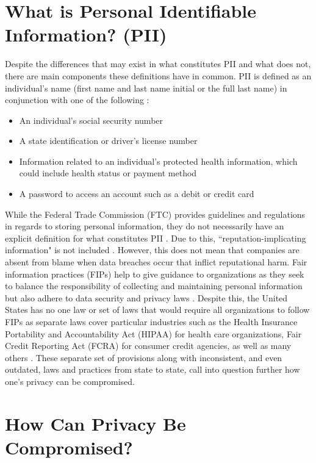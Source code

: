 \documentclass[sigconf]{acmart}
\begin{document}
\section{What is Personal Identifiable Information? (PII)}

Despite the differences that may exist in what constitutes PII and what does not, there are main components these definitions have in common. PII is defined as an individual's name (first name and last name initial or the full last name) in conjunction with one of the following \cite{Agelidis2016}:

\begin{itemize}
  \item An individual's social security number 
  \item A state identification or driver's license number
  \item Information related to an individual's protected health information, which could include health status or payment method
  \item A password to access an account such as a debit or credit card
\end{itemize} 

While the Federal Trade Commission (FTC) provides guidelines and regulations in regards to storing personal information, they do not necessarily have an explicit definition for what constitutes PII \cite{Agelidis2016}. Due to this, ``reputation-implicating information" is not included \cite{Agelidis2016}. However, this does not mean that companies are absent from blame when data breaches occur that inflict reputational harm. Fair information practices (FIPs) help to give guidance to organizations as they seek to balance the responsibility of collecting and maintaining personal information but also adhere to data security and privacy laws \cite{Culnan2009}. Despite this, the United States has no one law or set of laws that would require all organizations to follow FIPs as separate laws cover particular industries such as the Health Insurance Portability and Accountability Act (HIPAA) for health care organizations, Fair Credit Reporting Act (FCRA) for consumer credit agencies, as well as many others \cite{Culnan2009}. These separate set of provisions along with inconsistent, and even outdated, laws and practices from state to state, call into question further how one's privacy can be compromised.

\section{How Can Privacy Be Compromised?}
\end{document}
